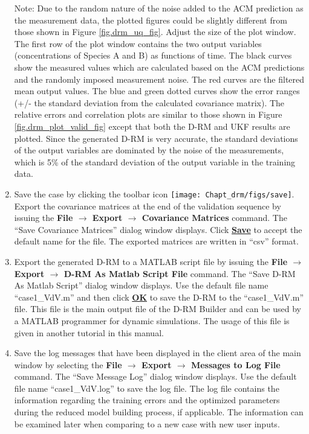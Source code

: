 \begin{enumerate}
	Note: Due to the random nature of the noise added to the ACM prediction as the measurement data, the plotted figures could be slightly different from those shown in Figure \ref{fig.drm_uq_fig}.  Adjust the size of the plot window.  The first row of the plot window contains the two output variables (concentrations of Species A and B) as functions of time.  The black curves show the measured values which are calculated based on the ACM predictions and the randomly imposed measurement noise.  The red curves are the filtered mean output values.  The blue and green dotted curves show the error ranges (+/- the standard deviation from the calculated covariance matrix).  The relative errors and correlation plots are similar to those shown in Figure \ref{fig.drm_plot_valid_fig} except that both the D-RM and UKF results are plotted.  Since the generated D-RM is very accurate, the standard deviations of the output variables are dominated by the noise of the measurements, which is 5\% of the standard deviation of the output variable in the training data.
	\item Save the case by clicking the toolbar icon \texttt{[image: Chapt\_drm/figs/save]}.  Export the covariance matrices at the end of the validation sequence by issuing the \textbf{File $\rightarrow$ Export $\rightarrow$ Covariance Matrices} command.  The ``Save Covariance Matrices'' dialog window displays.  Click \textbf{\underline{Save}} to accept the default name for the file.  The exported matrices are written in ``csv'' format.
	\item Export the generated D-RM to a MATLAB script file by issuing the \textbf{File $\rightarrow$ Export $\rightarrow$ D-RM As Matlab Script File} command.  The ``Save D-RM As Matlab Script'' dialog window displays.  Use the default file name ``case1\_VdV.m'' and then click \textbf{\underline{OK}} to save the D-RM to the ``case1\_VdV.m'' file.  This file is the main output file of the D-RM Builder and can be used by a MATLAB programmer for dynamic simulations.  The usage of this file is given in another tutorial in this manual.
	\item Save the log messages that have been displayed in the client area of the main window by selecting the \textbf{File $\rightarrow$ Export $\rightarrow$ Messages to Log File} command.  The ``Save Message Log'' dialog window displays.  Use the default file name ``case1\_VdV.log'' to save the log file.  The log file contains the information regarding the training errors and the optimized parameters during the reduced model building process, if applicable.  The information can be examined later when comparing to a new case with new user inputs.

\end{enumerate}
